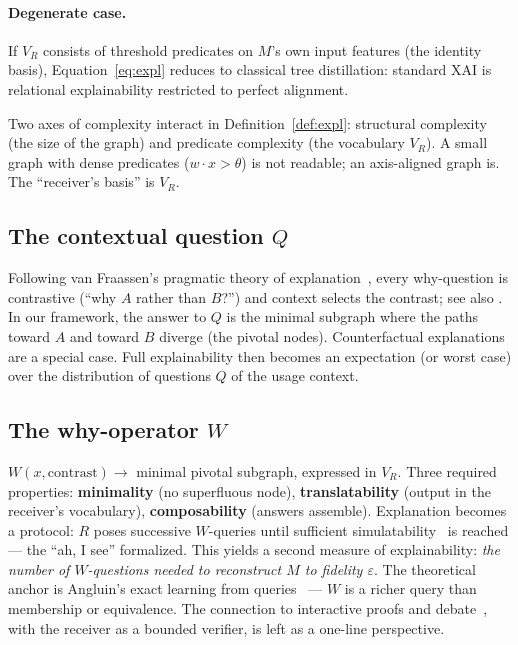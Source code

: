 \documentclass[10pt]{article}
\theoremstyle{definition}
\theoremstyle{plain}
\begin{document}
\paragraph{Degenerate case.} If $V_R$ consists of threshold predicates on $M$'s own input features (the identity basis), Equation~\eqref{eq:expl} reduces to classical tree distillation: standard XAI is relational explainability restricted to perfect alignment.

Two axes of complexity interact in Definition~\ref{def:expl}: structural complexity (the size of the graph) and predicate complexity (the vocabulary $V_R$). A small graph with dense predicates ($w \cdot x > \theta$) is not readable; an axis-aligned graph is. The ``receiver's basis'' is $V_R$.

\subsection{The contextual question $Q$}
\label{sec:question}

Following van Fraassen's pragmatic theory of explanation~\citep{vanfraassen1980scientific}, every why-question is contrastive (``why $A$ rather than $B$?'') and context selects the contrast; see also \citet{miller2019explanation}. In our framework, the answer to $Q$ is the minimal subgraph where the paths toward $A$ and toward $B$ diverge (the pivotal nodes). Counterfactual explanations~\citep{wachter2017counterfactual} are a special case. Full explainability then becomes an expectation (or worst case) over the distribution of questions $Q$ of the usage context.

\subsection{The why-operator $W$}
\label{sec:whyop}

$W(x, \text{contrast}) \to$ minimal pivotal subgraph, expressed in $V_R$. Three required properties: \textbf{minimality} (no superfluous node), \textbf{translatability} (output in the receiver's vocabulary), \textbf{composability} (answers assemble). Explanation becomes a protocol: $R$ poses successive $W$-queries until sufficient simulatability~\citep{doshivelez2017towards,hase2020evaluating} is reached --- the ``ah, I see'' formalized. This yields a second measure of explainability: \emph{the number of $W$-questions needed to reconstruct $M$ to fidelity $\varepsilon$}. The theoretical anchor is Angluin's exact learning from queries~\citep{angluin1988queries} --- $W$ is a richer query than membership or equivalence. The connection to interactive proofs and debate~\citep{irving2018ai}, with the receiver as a bounded verifier, is left as a one-line perspective.
\end{document}
